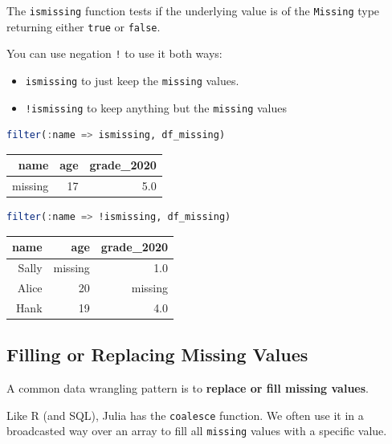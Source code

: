 \documentclass[
  notoc %
]{tufte-book}
\providecommand{\tightlist}{%
  \setlength{\itemsep}{0pt}\setlength{\parskip}{0pt}
}
\newcommand{\passthrough}[1]{#1}
\begin{document}
The \passthrough{\lstinline!ismissing!} function tests if the underlying
value is of the \passthrough{\lstinline!Missing!} type returning either
\passthrough{\lstinline!true!} or \passthrough{\lstinline!false!}.

You can use negation \passthrough{\lstinline"!"} to use it both ways:

\begin{itemize}
\tightlist
\item
  \passthrough{\lstinline!ismissing!} to just keep the
  \passthrough{\lstinline!missing!} values.
\item
  \passthrough{\lstinline"!ismissing"} to keep anything but the
  \passthrough{\lstinline!missing!} values
\end{itemize}

\begin{lstlisting}[language=Julia]
filter(:name => ismissing, df_missing)
\end{lstlisting}

\begin{longtable}[]{@{}rrr@{}}
\toprule
name & age & grade\_2020 \\
\midrule
\endhead
missing & 17 & 5.0 \\
\bottomrule
\end{longtable}

\begin{lstlisting}[language=Julia]
filter(:name => !ismissing, df_missing)
\end{lstlisting}

\begin{longtable}[]{@{}rrr@{}}
\toprule
name & age & grade\_2020 \\
\midrule
\endhead
Sally & missing & 1.0 \\
Alice & 20 & missing \\
Hank & 19 & 4.0 \\
\bottomrule
\end{longtable}

\hypertarget{sec:missing_filling}{%
\subsection{Filling or Replacing Missing
Values}\label{sec:missing_filling}}

A common data wrangling pattern is to \textbf{replace or fill missing
values}.

Like R (and SQL), Julia has the \passthrough{\lstinline!coalesce!}
function. We often use it in a broadcasted way over an array to fill all
\passthrough{\lstinline!missing!} values with a specific value.
\end{document}
